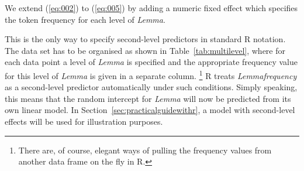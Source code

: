 We extend (\ref{eq:002}) to (\ref{eq:005}) by adding a numeric fixed effect which specifies the token frequency for each level of \textit{Lemma}.


This is the only way to specify second-level predictors in standard R notation.
The data set has to be organised as shown in Table~\ref{tab:multilevel}, where for each data point a level of \textit{Lemma} is specified and the appropriate frequency value for this level of \textit{Lemma} is given in a separate column.%
\footnote{There are, of course, elegant ways of pulling the frequency values from another data frame on the fly in R.}
R treats \textit{Lemmafrequency} as a second-level predictor automatically under such conditions.
Simply speaking, this means that the random intercept for \textit{Lemma} will now be predicted from its own linear model.
In Section~\ref{sec:practicalguidewithr}, a model with second-level effects will be used for illustration purposes.


